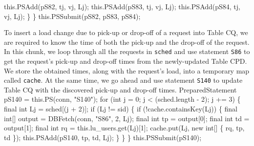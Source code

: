 \documentclass{article}
\def\nwendcode{\endtrivlist \endgroup}      %
\let\nwdocspar=\par
\theoremstyle{definition}                   %
\begin{document}
    this.PSAdd(pS82, tj, vj, Lj);
    this.PSAdd(pS83, tj, vj, Lj);
    this.PSAdd(pS84, tj, vj, Lj);
  \}
\}
this.PSSubmit(pS82, pS83, pS84);
\nwendcode{}\nwdocspar
{\small To insert a load change due to pick-up or drop-off of a request into
Table CQ, we are required to know the time of both the pick-up and the drop-off
of the request. In this chunk, we loop through all the requests in {\tt{}sched}
and use statement {\tt{}\protect{}S86} to get the request's pick-up and drop-off times from
the newly-updated Table CPD. We store the obtained times, along with the
request's load, into a temporary map called {\tt{}cache}. At the same time, we go
ahead and use statement {\tt{}\protect{}S140} to update Table CQ with the discovered pick-up
and drop-off times.}
\nwenddocs{}\endmoddef{}
PreparedStatement pS140 = this.PS(conn, "S140");
for (int j = 0; j < (sched.length - 2); j += 3) \{
  final int Lj = sched[(j + 2)];
  if (Lj != sid) \{
    if (!cache.containsKey(Lj)) \{
      final int[] output = DBFetch(conn, "S86", 2, Lj);
      final int tp = output[0];
      final int td = output[1];
      final int rq = this.lu_users.get(Lj)[1];
      cache.put(Lj, new int[] \{ rq, tp, td \});
      this.PSAdd(pS140, tp, td, Lj);
    \}
  \}
\}
this.PSSubmit(pS140);
\nwendcode{}\nwdocspar
\end{document}
